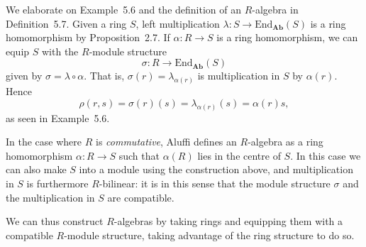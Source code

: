 \documentclass[article, a4paper, 11pt, oneside]{memoir}
\numberwithin{equation}{chapter}
\newcommand{\ncat}[1]{\mathbf{#1}} %
\newcommand{\catAb}{\ncat{Ab}} %
\newcommand{\End}{\mathrm{End}}
\theoremstyle{nonumberplain}
\begin{document}
\begin{remarkbreak}[$R$-algebras]
    We elaborate on Example~5.6 and the definition of an $R$-algebra in Definition~5.7. Given a ring $S$, left multiplication $\lambda \colon S \to \End_\catAb(S)$ is a ring homomorphism by Proposition~2.7. If $\alpha \colon R \to S$ is a ring homomorphism, we can equip $S$ with the $R$-module structure
    \begin{equation*}
        \sigma \colon R \to \End_\catAb(S)
    \end{equation*}
    given by $\sigma = \lambda \circ \alpha$. That is, $\sigma(r) = \lambda_{\alpha(r)}$ is multiplication in $S$ by $\alpha(r)$. Hence
    \begin{equation*}
        \rho(r,s)
            = \sigma(r)(s)
            = \lambda_{\alpha(r)}(s)
            = \alpha(r)s,
    \end{equation*}
    as seen in Example~5.6.

    In the case where $R$ is \emph{commutative}, Aluffi defines an $R$-algebra as a ring homomorphism $\alpha \colon R \to S$ such that $\alpha(R)$ lies in the centre of $S$. In this case we can also make $S$ into a module using the construction above, and multiplication in $S$ is furthermore $R$-bilinear: it is in this sense that the module structure $\sigma$ and the multiplication in $S$ are compatible.

    We can thus construct $R$-algebras by taking rings and equipping them with a compatible $R$-module structure, taking advantage of the ring structure to do so.


\end{remarkbreak}
\end{document}
